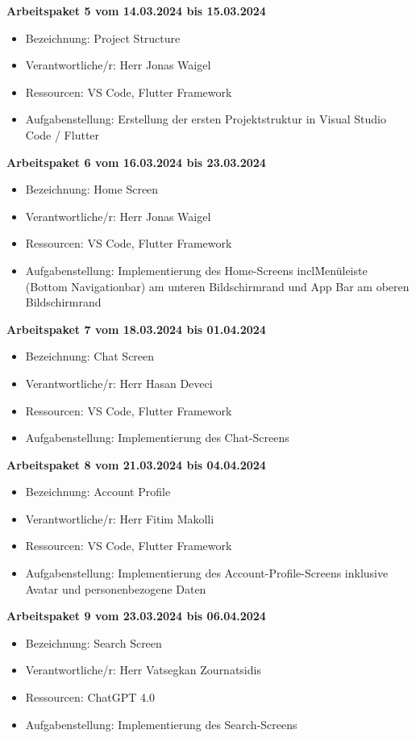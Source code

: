 \newpage
\textbf{Arbeitspaket 5 vom 14.03.2024 bis 15.03.2024}
\begin{itemize}[itemsep=0pt]
    \item{Bezeichnung: Project Structure} 
	\item{Verantwortliche/r: Herr Jonas Waigel} 
	\item{Ressourcen: VS Code, Flutter Framework} 
    \item{Aufgabenstellung: Erstellung der ersten Projektstruktur in Visual Studio Code / Flutter}
\end{itemize}

\textbf{Arbeitspaket 6 vom 16.03.2024 bis 23.03.2024}
\begin{itemize}[itemsep=0pt]
    \item{Bezeichnung: Home Screen} 
	\item{Verantwortliche/r: Herr Jonas Waigel} 
	\item{Ressourcen: VS Code, Flutter Framework} 
    \item{Aufgabenstellung: Implementierung des Home-Screens incl\. Menüleiste (Bottom Navigationbar) am unteren Bildschirmrand und App Bar am oberen Bildschirmrand}
\end{itemize}

\textbf{Arbeitspaket 7 vom 18.03.2024 bis 01.04.2024}
\begin{itemize}[itemsep=0pt]
    \item{Bezeichnung: Chat Screen} 
	\item{Verantwortliche/r: Herr Hasan Deveci} 
	\item{Ressourcen: VS Code, Flutter Framework} 
    \item{Aufgabenstellung: Implementierung des Chat-Screens}
\end{itemize} 

\textbf{Arbeitspaket 8 vom 21.03.2024 bis 04.04.2024}
\begin{itemize}[itemsep=0pt]
    \item{Bezeichnung: Account Profile} 
	\item{Verantwortliche/r: Herr Fitim Makolli} 
	\item{Ressourcen: VS Code, Flutter Framework} 
    \item{Aufgabenstellung: Implementierung des Account-Profile-Screens inklusive Avatar und personenbezogene Daten}
\end{itemize}


\textbf{Arbeitspaket 9 vom 23.03.2024 bis 06.04.2024}
\begin{itemize}[itemsep=0pt]
    \item{Bezeichnung: Search Screen} 
	\item{Verantwortliche/r: Herr Vatsegkan Zournatsidis} 
	\item{Ressourcen: ChatGPT 4.0} 
    \item{Aufgabenstellung: Implementierung des Search-Screens}
\end{itemize}


